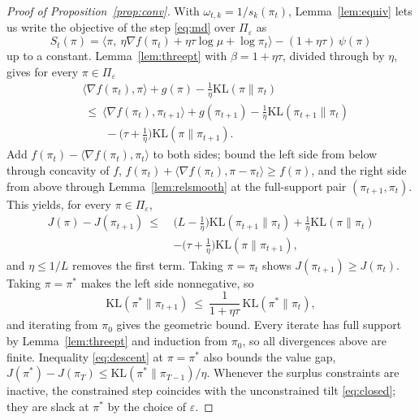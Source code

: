 \documentclass[letterpaper]{article} %
\newcommand{\KL}{\mathrm{KL}}
\begin{document}
\begin{proof}[Proof of Proposition~\ref{prop:conv}]
With $\omega_{t,k}=1/s_k(\pi_t)$, Lemma~\ref{lem:equiv} lets us write the objective of the step \eqref{eq:md} over $\Pi_\varepsilon$ as
\[
S_t(\pi)=\big\langle\pi,\ \eta\nabla f(\pi_t)+\eta\tau\log\mu+\log\pi_t\big\rangle-(1+\eta\tau)\,\psi(\pi)
\]
up to a constant. Lemma~\ref{lem:threept} with $\beta=1+\eta\tau$, divided through by $\eta$, gives for every $\pi\in\Pi_\varepsilon$
\begin{equation}
\begin{aligned}
&\langle\nabla f(\pi_t),\pi\rangle+g(\pi)-\tfrac1\eta\KL(\pi\|\pi_t)\\
&\ \le\ \langle\nabla f(\pi_t),\pi_{t+1}\rangle+g(\pi_{t+1})-\tfrac1\eta\KL(\pi_{t+1}\|\pi_t)\\
&\qquad-\big(\tau+\tfrac1\eta\big)\KL(\pi\|\pi_{t+1}).
\end{aligned}
\label{eq:threepoint}
\end{equation}
Add $f(\pi_t)-\langle\nabla f(\pi_t),\pi_t\rangle$ to both sides; bound the left side from below through concavity of $f$, $f(\pi_t)+\langle\nabla f(\pi_t),\pi-\pi_t\rangle\ge f(\pi)$, and the right side from above through Lemma~\ref{lem:relsmooth} at the full-support pair $(\pi_{t+1},\pi_t)$. This yields, for every $\pi\in\Pi_\varepsilon$,
\begin{equation}
\begin{aligned}
J(\pi)-J(\pi_{t+1})\ \le\ &\big(L-\tfrac1\eta\big)\KL(\pi_{t+1}\|\pi_t)+\tfrac1\eta\KL(\pi\|\pi_t)\\
&-\big(\tau+\tfrac1\eta\big)\KL(\pi\|\pi_{t+1}),
\end{aligned}
\label{eq:descent}
\end{equation}
and $\eta\le1/L$ removes the first term. Taking $\pi=\pi_t$ shows $J(\pi_{t+1})\ge J(\pi_t)$. Taking $\pi=\pi^\ast$ makes the left side nonnegative, so
\[
\KL(\pi^\ast\|\pi_{t+1})\ \le\ \frac{1}{1+\eta\tau}\,\KL(\pi^\ast\|\pi_t),
\]
and iterating from $\pi_0$ gives the geometric bound. Every iterate has full support by Lemma~\ref{lem:threept} and induction from $\pi_0$, so all divergences above are finite. Inequality \eqref{eq:descent} at $\pi=\pi^\ast$ also bounds the value gap, $J(\pi^\ast)-J(\pi_T)\le\KL(\pi^\ast\|\pi_{T-1})/\eta$. Whenever the surplus constraints are inactive, the constrained step coincides with the unconstrained tilt \eqref{eq:closed}; they are slack at $\pi^\ast$ by the choice of $\varepsilon$.
\end{proof}
\end{document}
